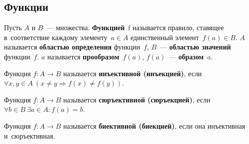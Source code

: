\subsection{Функции}
Пусть $A$ и $B$~--- множества.
\textbf{Функцией}~f называется правило, ставящее в~соответствие каждому элементу~$a \in A$ единственный элемент~$f(a) \in B$.
$A$ называется \textbf{областью определения} функции~$f$, $B$~--- \textbf{областью значений} функции~$f$.
$a$ называется \textbf{прообразом}~$f(a)$, $f(a)$~--- \textbf{образом}~$a$.

Функция $f \colon A \to B$ называется \textbf{инъективной (инъекцией)}, если
$\forall x, y \in A	\ \allowbreak (x \neq y \Rightarrow f(x) \neq f(y))$.

Функция $f \colon A \to B$ называется \textbf{сюръективной (сюръекцией)}, если
$\forall b \in B \ \allowbreak \exists a \in A \colon \allowbreak f(a) = b$.

Функция $f \colon A \to B$ называется \textbf{биективной (биекцией)}, если она инъективная
и~сюръективная.